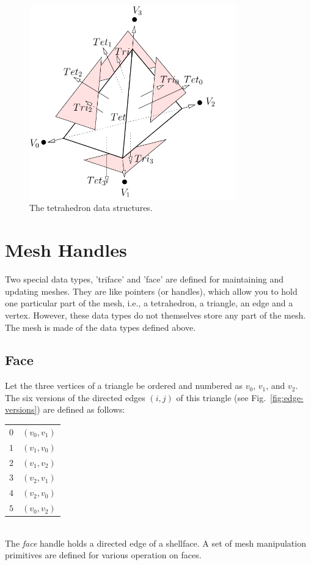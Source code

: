 \begin{figure}
  \centering
  \includegraphics[width=0.8\textwidth]{../figs/tetrahedron-based}
\caption{The tetrahedron data structures.}
\label{fig:tetrahedron}
\end{figure}

\section{Mesh Handles}

Two special data types, 'triface' and 'face' are defined for maintaining and updating meshes. They are like pointers (or handles), which allow you to hold one particular part of the mesh, i.e., a tetrahedron, a triangle, an edge and a vertex.  However, these data types do not themselves store any part of the mesh. The mesh is made of the data types defined above.

\subsection{Face}

Let the three vertices of a triangle be ordered and numbered as $v_0$, $v_1$, and $v_2$. The six versions of the directed edges $(i, j)$ of this triangle (see Fig.~\ref{fig:edge-versions}) are defined as follows:\\
\begin{tabular}{rl}
$0$ & $(v_0, v_1)$\\
$1$ & $(v_1, v_0)$\\
$2$ & $(v_1, v_2)$\\
$3$ & $(v_2, v_1)$\\
$4$ & $(v_2, v_0)$\\
$5$ & $(v_0, v_2)$
\end{tabular}\\
The {\it face} handle holds a directed edge of a shellface. A set of mesh manipulation primitives are defined for various operation on faces.

